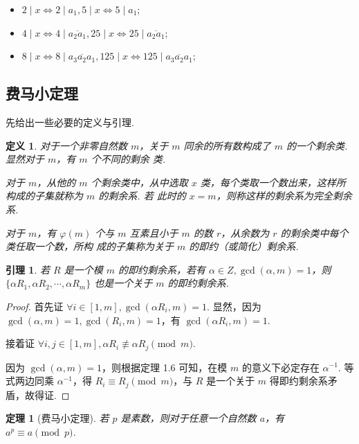 \documentclass[a4paper]{article}
\newtheorem{theorem}{定理}[section]
\newtheorem{lemma}{引理}[section]
\newtheorem{definition}{定义}[section]
\begin{document}
\begin{itemize}
    \item $2\mid x\Leftrightarrow 2\mid a_1,5\mid x\Leftrightarrow 5\mid a_1$;
    \item $4\mid x\Leftrightarrow 4\mid \overline{a_2a_1},25\mid x\Leftrightarrow 25 \mid \overline{
                  a_2a_1}$;
    \item $8\mid x\Leftrightarrow 8\mid \overline{a_3a_2a_1},125\mid x\Leftrightarrow 125\mid
              \overline{a_3a_2a_1}$;
\end{itemize}

\subsection{费马小定理}

先给出一些必要的定义与引理. 

\begin{definition}
    对于一个非零自然数 $m$，关于 $m$ 同余的所有数构成了 $m$ 的一个剩余类. 显然对于 $m$，有 $m$ 个不同的剩余
    类.

    对于 $m$，从他的 $m$ 个剩余类中，从中选取 $x$ 类，每个类取一个数出来，这样所构成的子集就称为 $m$ 的剩余系. 若
    此时的 $x=m$，则称这样的剩余系为完全剩余系.

    对于 $m$，有 $\varphi(m)$ 个与 $m$ 互素且小于 $m$ 的数 $r$，从余数为 $r$ 的剩余类中每个类任取一个数，所构
    成的子集称为关于 $m$ 的即约（或简化）剩余系.
\end{definition}

\begin{lemma}
    若 $R$ 是一个模 $m$ 的即约剩余系，若有 $\alpha\in Z,\gcd(\alpha,m)=1$，则 $\{\alpha R_1,\alpha R_2,
        \cdots, \alpha R_m\}$ 也是一个关于 $m$ 的即约剩余系.
\end{lemma}

\begin{proof}
    首先证 $\forall i \in [1,m],\gcd(\alpha R_i,m)=1$. 显然，因为 $\gcd(\alpha,m)=1,\gcd(R_i,m)=1$，有 $\gcd
        (\alpha R_i,m)=1$.

    接着证 $\forall i,j\in [1,m],\alpha R_i \not\equiv \alpha R_j \pmod m$.

    因为 $\gcd(\alpha,m)=1$，则根据定理 1.6 可知，在模 $m$ 的意义下必定存在 $\alpha^{-1}$. 等式两边同乘 $\alpha
        ^{-1}$，得 $R_i\equiv R_j\pmod m$，与 $R$ 是一个关于 $m$ 得即约剩余系矛盾，故得证.
\end{proof}

\begin{theorem}[费马小定理]
    若 $p$ 是素数，则对于任意一个自然数 $a$，有 $a^p\equiv a\pmod p$.
\end{theorem}
\end{document}
